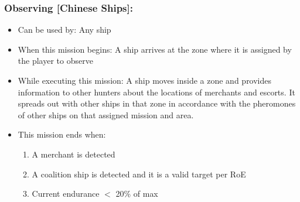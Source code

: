 \documentclass{article}
\begin{document}
    \subsubsection{Observing [Chinese Ships]:}
            \begin{itemize}
                \item{Can be used by:} Any ship
                \item{When this mission begins:} A ship arrives at the zone where it is assigned by the player to observe
                \item{While executing this mission:} A ship moves inside a zone and provides information to other hunters about the locations of merchants and escorts. It spreads out with other ships in that zone in accordance with the pheromones of other ships on that assigned mission and area. 
                \item{This mission ends when:} 
                \begin{enumerate}[label=\arabic*)]
                    \item A merchant is detected \par 
                    [Hunter begins tracking that merchant; merchant is put into the detected merchant manage.]
                    \item A coalition ship is detected and it is a valid target per RoE \par
                    [Begin `Attacking Ship - Non-Deckgun']
                    \item Current endurance $<$ 20\% of max \par
                    [Hunter begins `Transit to Base']
                \end{enumerate}
            \end{itemize}
\end{document}

